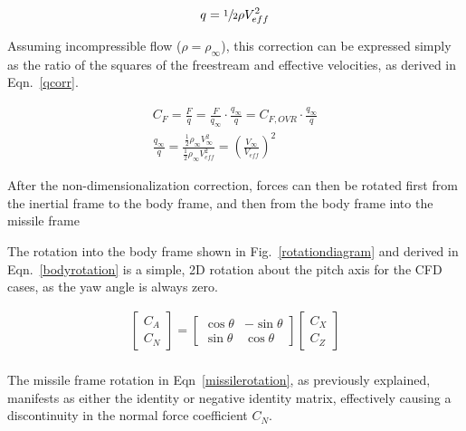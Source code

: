 \documentclass[]{aiaa-tc}%
\begin{document}
\begin{equation} \label{qbar}
  q=\sfrac{1}{2}\rho V_{eff}^2
\end{equation}

\noindent Assuming incompressible flow ($\rho = \rho_{\infty}$), this correction can be expressed simply as the ratio of the squares of the freestream and effective velocities, as derived in Eqn.~\ref{qcorr}.

\begin{equation} \label{qcorr}
\begin{gathered}
  C_F = \frac{F}{q} = \frac{F}{q_{\infty}} \cdot \frac{q_{\infty}}{q}
      = C_{F,OVR} \cdot \frac{q_{\infty}}{q} \\
  \frac{q_{\infty}}{q} = \frac{\frac{1}{2}\rho_{\infty} V_{\infty}^2}
                              {\frac{1}{2}\rho_{\infty} V_{eff}^2}
                =\left(\frac{V_{\infty}}{V_{eff}}\right)^2
\end{gathered}
\end{equation}

After the non-dimensionalization correction, forces can then be rotated first from the inertial frame to the body frame, and then from the body frame into the missile frame

The rotation into the body frame shown in Fig.~\ref{rotationdiagram} and derived in Eqn.~\ref{bodyrotation} is a simple, 2D rotation about the pitch axis for the CFD cases, as the yaw angle is always zero.

\begin{equation} \label{bodyrotation}
\begin{split}
  \begin{bmatrix}
  {C_A} \\
  {C_N}
  \end{bmatrix}
  =
  \begin{bmatrix}
  {\cos\theta} & {-\sin\theta} \\
  {\sin\theta} & { \cos\theta}
  \end{bmatrix}
  \begin{bmatrix}
  {C_X} \\
  {C_Z}
  \end{bmatrix} \\
\end{split}
\end{equation}

\noindent The missile frame rotation in Eqn~\ref{missilerotation}, as previously explained, manifests as either the identity or negative identity matrix, effectively causing a discontinuity in the normal force coefficient $C_N$.
\end{document}
